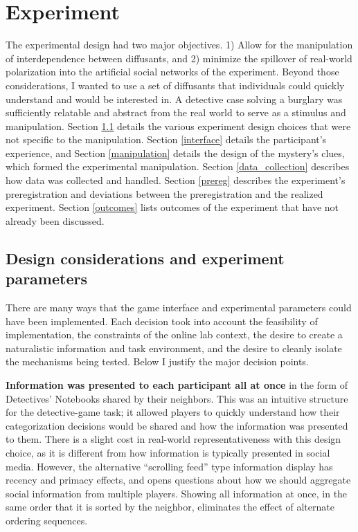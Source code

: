 \documentclass{article}
\begin{document}
\section{Experiment}
The experimental design had two major objectives. 1) Allow for the manipulation of interdependence between diffusants, and 2) minimize the spillover of real-world polarization into the artificial social networks of the experiment. Beyond those considerations, I wanted to use a set of diffusants that individuals could quickly understand and would be interested in. A detective case solving a burglary was sufficiently relatable and abstract from the real world to serve as a stimulus and manipulation. Section \ref{design_considerations} details the various experiment design choices that were not specific to the manipulation. Section \ref{interface} details the participant's experience, and Section \ref{manipulation} details the design of the mystery's clues, which formed the experimental manipulation. Section \ref{data_collection} describes how data was collected and handled. Section \ref{prereg} describes the experiment's preregistration and deviations between the preregistration and the realized experiment. Section \ref{outcomes} lists outcomes of the experiment that have not already been discussed. 




\subsection{Design considerations and experiment parameters}
\label{design_considerations}
There are many ways that the game interface and experimental parameters could have been implemented. Each decision took into account the feasibility of implementation, the constraints of the online lab context, the desire to create a naturalistic information and task environment, and the desire to cleanly isolate the mechanisms being tested. Below I justify the major decision points.

\textbf{Information was presented to each participant all at once} in the form of Detectives' Notebooks shared by their neighbors. This was an intuitive structure for the detective-game task; it allowed players to quickly understand how their categorization decisions would be shared and how the information was presented to them. There is a slight cost in real-world representativeness with this design choice, as it is different from how information is typically presented in social media. However, the alternative ``scrolling feed'' type information display has recency and primacy effects, and opens questions about how we should aggregate social information from multiple players. Showing all information at once, in the same order that it is sorted by the neighbor, eliminates the effect of alternate ordering sequences.
\end{document}
